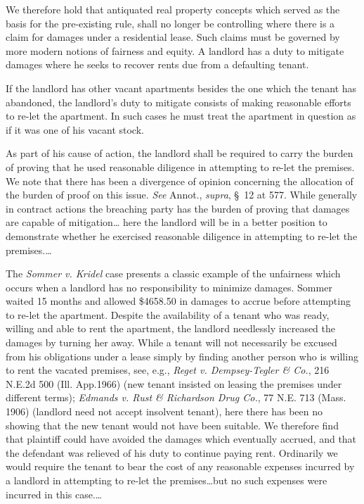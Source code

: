 We therefore hold that antiquated real property concepts which served as the
basis for the pre-existing rule, shall no longer be controlling where there is
a claim for damages under a residential lease. Such claims must be governed by
more modern notions of fairness and equity. A landlord has a duty to mitigate
damages where he seeks to recover rents due from a defaulting tenant.

If the landlord has other vacant apartments besides the one which the tenant has
abandoned, the landlord's duty to mitigate consists of making reasonable
efforts to re-let the apartment. In such cases he must treat the apartment in
question as if it was one of his vacant stock.

As part of his cause of action, the landlord shall be required to carry the
burden of proving that he used reasonable diligence in attempting to re-let the
premises. We note that there has been a divergence of opinion concerning the
allocation of the burden of proof on this issue. \textit{See} Annot.,
\textit{supra}, \S~12 at 577. While generally in contract actions the breaching
party has the burden of proving that damages are capable of mitigation\ldots
here the landlord will be in a better position to demonstrate whether he
exercised reasonable diligence in attempting to re-let the premises.\ldots


The \textit{Sommer v. Kridel} case presents a classic example of the unfairness
which occurs when a landlord has no responsibility to minimize damages. Sommer
waited 15 months and allowed \$4658.50 in damages to accrue before attempting
to re-let the apartment. Despite the availability of a tenant who was ready,
willing and able to rent the apartment, the landlord needlessly increased the
damages by turning her away. While a tenant will not necessarily be excused
from his obligations under a lease simply by finding another person who is
willing to rent the vacated premises, see, e.g., \textit{Reget v.
Dempsey-Tegler \& Co.}, 216 N.E.2d 500 (Ill. App.1966) (new tenant insisted on
leasing the premises under different terms); \textit{Edmands v. Rust \&
Richardson Drug Co.}, 77 N.E. 713 (Mass. 1906) (landlord need not accept
insolvent tenant), here there has been no showing that the new tenant would not
have been suitable. We therefore find that plaintiff could have avoided the
damages which eventually accrued, and that the defendant was relieved of his
duty to continue paying rent. Ordinarily we would require the tenant to bear
the cost of any reasonable expenses incurred by a landlord in attempting to
re-let the premises\ldots but no such expenses were incurred in this case.\ldots

